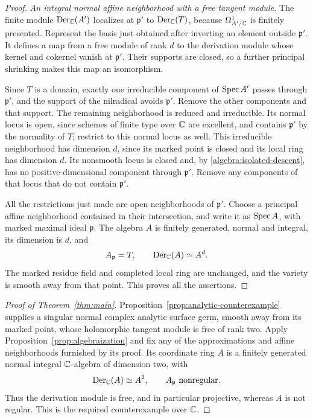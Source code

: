 \begin{proof}
\emph{An integral normal affine neighborhood with a free tangent module.}
The finite module $\operatorname{Der}_{\mathbb C}(A')$ localizes at $\mathfrak p'$ to
$\operatorname{Der}_{\mathbb C}(T)$, because $\Omega^1_{A'/\mathbb C}$ is finitely presented.
Represent the basis just obtained after inverting an element outside
$\mathfrak p'$.  It defines a map from a free module of rank $d$ to
the derivation module whose kernel and cokernel vanish at
$\mathfrak p'$.  Their supports are closed, so a further principal
shrinking makes this map an isomorphism.

Since $T$ is a domain, exactly one irreducible component of $\operatorname{Spec} A'$
passes through $\mathfrak p'$, and the support of the nilradical avoids
$\mathfrak p'$.  Remove the other components and that support.  The
remaining neighborhood is reduced and irreducible.  Its normal locus
is open, since schemes of finite type over $\mathbb C$ are excellent, and
contains $\mathfrak p'$ by the normality of $T$; restrict to this
normal locus as well.  This irreducible neighborhood has dimension
$d$, since its marked point is closed and its local ring has dimension
$d$.  Its nonsmooth locus is closed and, by
\eqref{algebra:isolated-descent}, has no positive-dimensional component
through $\mathfrak p'$.  Remove any components of that locus that do
not contain $\mathfrak p'$.

All the restrictions just made are open neighborhoods of
$\mathfrak p'$.  Choose a principal affine neighborhood contained in
their intersection, and write it as $\operatorname{Spec} A$, with marked maximal
ideal $\mathfrak p$.  The algebra $A$ is finitely generated, normal
and integral, its dimension is $d$, and
\[
 A_{\mathfrak p}=T,\qquad
 \operatorname{Der}_{\mathbb C}(A)\simeq A^d.
\]
The marked residue field and completed local ring are unchanged, and
the variety is smooth away from that point.  This proves all the
assertions.
\end{proof}

\begin{proof}[Proof of Theorem~\ref{thm:main}]
Proposition~\ref{prop:analytic-counterexample} supplies a singular
normal complex analytic surface germ, smooth away from its marked
point, whose holomorphic tangent module is free of rank two.
Apply Proposition~\ref{prop:algebraization} and fix any of the
approximations and affine neighborhoods furnished by its proof.  Its
coordinate ring $A$ is a finitely generated normal integral
$\mathbb C$-algebra of dimension two, with
\[
 \operatorname{Der}_{\mathbb C}(A)\simeq A^2,
 \qquad A_{\mathfrak p}\text{ nonregular}.
\]
Thus the derivation module is free, and in particular projective,
whereas $A$ is not regular.  This is the required counterexample over
$\mathbb C$.
\end{proof}

